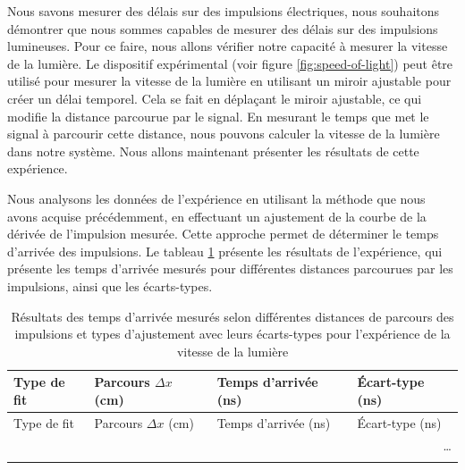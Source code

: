 \begin{onehalfspace}

    Nous savons mesurer des délais sur des impulsions électriques, nous 
    souhaitons démontrer que nous sommes capables de mesurer des délais 
    sur des impulsions lumineuses. Pour ce faire, nous allons vérifier 
    notre capacité à mesurer la vitesse de la lumière. Le dispositif expérimental
    (voir figure \ref{fig:speed-of-light})
    peut être utilisé pour mesurer la vitesse de la lumière en
    utilisant un miroir ajustable pour
    créer un délai temporel. Cela se fait en
    déplaçant le miroir ajustable, ce qui modifie la distance parcourue
    par le signal. En mesurant le temps que met le signal à parcourir 
    cette distance, nous pouvons calculer la vitesse de la lumière dans notre
    système. Nous allons maintenant présenter les résultats de cette expérience.

    \noindent Nous analysons les données de l'expérience en utilisant la
    méthode que nous avons acquise précédemment, en effectuant un ajustement de
    la courbe de la dérivée de l'impulsion mesurée. Cette approche
    permet de déterminer le temps d'arrivée des impulsions. Le tableau 
    \ref{table:fits_light} présente les résultats de l'expérience,
    qui présente les temps d’arrivée mesurés pour différentes distances 
    parcourues par les impulsions, ainsi que les écarts-types. 


    \begin{longtable}{p{2.0cm} p{2.0cm} p{4.0cm} p{2.0cm} }
        \caption{Résultats des temps d’arrivée mesurés selon différentes distances 
        de parcours des impulsions et types d’ajustement avec leurs 
        écarts-types pour l'expérience de la vitesse de la lumière} \\
        \toprule
        \label{table:fits_light}
        Type de fit & Parcours $\Delta x$ (cm) & Temps d'arrivée (ns) & Écart-type (ns) \\
        \midrule
        \endfirsthead
        
        \toprule
        Type de fit & Parcours $\Delta x$ (cm) & Temps d'arrivée (ns) & Écart-type (ns) \\
        \midrule
        \endhead
        
        \midrule
        \multicolumn{4}{r}{{\dots}} \\
        \midrule
        \endfoot
        
        \bottomrule
        \endlastfoot
        

\end{longtable}
\end{onehalfspace}
